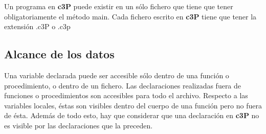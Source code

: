 
Un programa en \textbf{c3P} puede existir en un sólo fichero que tiene que tener
obligatoriamente el método main. Cada fichero escrito en \textbf{c3P} tiene que
tener la extensión .c3P o .c3p

\subsection{Alcance de los datos}

Una variable declarada puede ser accesible sólo dentro de una función o procedimiento,
o dentro de un fichero. Las declaraciones realizadas fuera de funciones o procedimientos
son accesibles para todo el archivo. Respecto a las variables locales, éstas son visibles dentro
del cuerpo de una función pero no fuera de ésta. Además de todo esto, hay que considerar que una
declaración en \textbf{c3P} no es visible por las declaraciones que la preceden.
